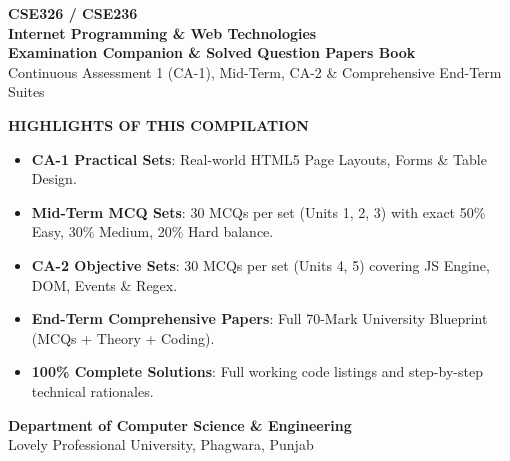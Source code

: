 \begin{titlepage}
\begin{center}
\vspace*{10mm}
{\Huge\sffamily\bfseries\color{CSNavy} CSE326 / CSE236}\\[3mm]
{\LARGE\sffamily\bfseries\color{CSCyan} Internet Programming \& Web Technologies}\\[6mm]
{\Large\sffamily\bfseries Examination Companion \& Solved Question Papers Book}\\[4mm]
{\large\color{DarkSlate} Continuous Assessment 1 (CA-1), Mid-Term, CA-2 \& Comprehensive End-Term Suites}\\[15mm]

\begin{tcolorbox}[enhanced,colback=LightBg,colframe=CSNavy,arc=3mm,width=0.9\textwidth,boxrule=1.5pt]
\centering\vspace{2mm}
{\large\sffamily\bfseries\color{CSNavy} HIGHLIGHTS OF THIS COMPILATION}\\[3mm]
\begin{itemize}[leftmargin=8mm,itemsep=1.5mm]
  \item \textbf{CA-1 Practical Sets}: Real-world HTML5 Page Layouts, Forms \& Table Design.
  \item \textbf{Mid-Term MCQ Sets}: 30 MCQs per set (Units 1, 2, 3) with exact 50\% Easy, 30\% Medium, 20\% Hard balance.
  \item \textbf{CA-2 Objective Sets}: 30 MCQs per set (Units 4, 5) covering JS Engine, DOM, Events \& Regex.
  \item \textbf{End-Term Comprehensive Papers}: Full 70-Mark University Blueprint (MCQs + Theory + Coding).
  \item \textbf{100\% Complete Solutions}: Full working code listings and step-by-step technical rationales.
\end{itemize}
\vspace{2mm}
\end{tcolorbox}

\vfill
{\large\sffamily\bfseries Department of Computer Science \& Engineering}\\
{\large Lovely Professional University, Phagwara, Punjab}
\end{center}
\end{titlepage}
